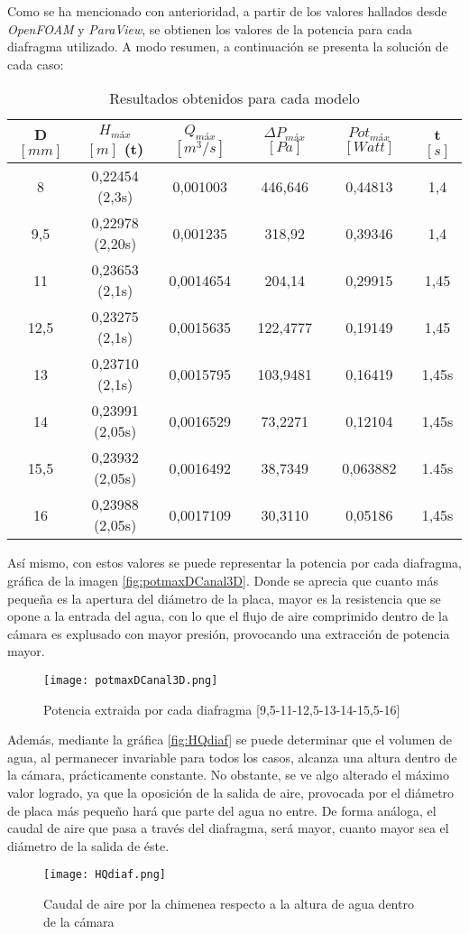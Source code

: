 Como se ha mencionado con anterioridad, a partir de los valores hallados
desde \emph{OpenFOAM} y \emph{ParaView}, se obtienen los valores de la
potencia para cada diafragma utilizado. A modo resumen, a continuación
se presenta la solución de cada caso:

\begin{longtable}[]{cccccc}
\caption{Resultados obtenidos para cada modelo}
\hline
D $[mm]$ & \(H_{máx}\) $[m]$ (t) & \(Q_{máx}\) $[m^3/s]$ &
\(\Delta P_{máx}\) $[Pa]$ & \(Pot_{máx}\) $[Watt]$ & t $[s]$ \tabularnewline
\hline
\endhead
8 & 0,22454 (2,3s) & 0,001003 & 446,646 & 0,44813 & 1,4\tabularnewline
9,5 & 0,22978 (2,20s) & 0,001235 & 318,92 & 0,39346 & 1,4\tabularnewline
11 & 0,23653 (2,1s) & 0,0014654 & 204,14 & 0,29915 & 1,45\tabularnewline
12,5 & 0,23275 (2,1s) & 0,0015635 & 122,4777 & 0,19149 & 1,45\tabularnewline
13 & 0,23710 (2,1s) & 0,0015795 & 103,9481 & 0,16419 & 1,45s\tabularnewline
14 & 0,23991 (2,05s) & 0,0016529 & 73,2271 & 0,12104 & 1,45s\tabularnewline
15,5 & 0,23932 (2,05s) & 0,0016492 & 38,7349 & 0,063882 & 1.45s\tabularnewline
16 & 0,23988 (2,05s) & 0,0017109 & 30,3110 & 0,05186 & 1,45s\tabularnewline
\hline
\end{longtable}

Así mismo, con estos valores se puede representar la potencia por cada
diafragma, gráfica de la imagen \autoref{fig:potmaxDCanal3D}. Donde se aprecia que cuanto más pequeña es la apertura del
diámetro de la placa, mayor es la resistencia que se opone a la entrada
del agua, con lo que el flujo de aire comprimido dentro de la cámara es
explusado con mayor presión, provocando una extracción de potencia
mayor.

\begin{figure}
\centering
\texttt{[image: potmaxDCanal3D.png]}
\caption{Potencia extraida por cada diafragma [9,5-11-12,5-13-14-15,5-16]}
\label{fig:potmaxDCanal3D}
\end{figure}

Además, mediante la gráfica \autoref{fig:HQdiaf} se puede determinar que el volumen
de agua, al permanecer invariable para todos los casos, alcanza una
altura dentro de la cámara, prácticamente constante. No obstante, se ve
algo alterado el máximo valor logrado, ya que la oposición de la salida
de aire, provocada por el diámetro de placa más pequeño hará que parte
del agua no entre. De forma análoga, el caudal de aire que pasa a través
del diafragma, será mayor, cuanto mayor sea el diámetro de la salida de
éste.

\begin{figure}
\centering
\texttt{[image: HQdiaf.png]}
\caption[Caudal de aire por la chimenea]{Caudal de aire por la chimenea respecto a la altura de agua dentro de la cámara}
\label{fig:HQdiaf}
\end{figure}
